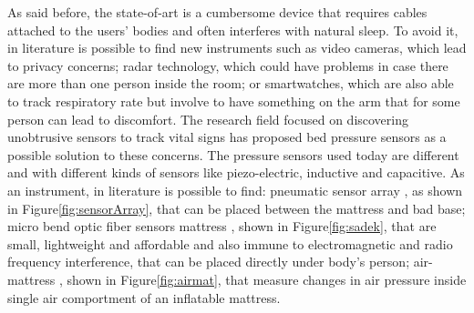 As said before, the state-of-art is a cumbersome device that requires cables attached to the users' bodies and often interferes with natural sleep. To avoid it, in literature is possible to find new instruments such as video cameras, which lead to privacy concerns; radar technology, which could have problems in case there are more than one person inside the room; or smartwatches, which are also able to track respiratory rate but involve to have something on the arm that for some person can lead to discomfort.
\newline
The research field focused on discovering unobtrusive sensors to track vital signs has proposed bed pressure sensors as a possible solution to these concerns. 
The pressure sensors used today are different and with different kinds of sensors like piezo-electric, inductive and capacitive. As an instrument, in literature is possible to find: pneumatic sensor array \cite{Holtzman2010ValidationEnvironments}, as shown in Figure\ref{fig:sensorArray}, that can be placed between the mattress and bad base; micro bend optic fiber sensors mattress \cite{Sadek2017NonintrusiveStudy}, shown in Figure\ref{fig:sadek}, that are small, lightweight and affordable and also immune to electromagnetic and radio frequency interference, that can be placed directly under body's person; air-mattress \cite{articleAir}, shown in Figure\ref{fig:airmat}, that measure changes in air pressure inside single air comportment of an inflatable mattress.


